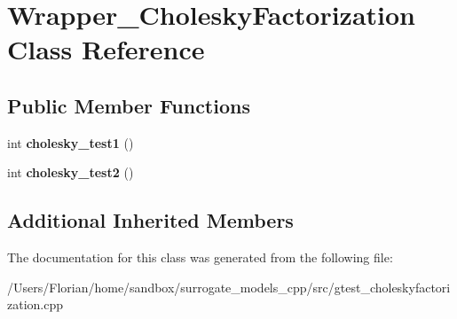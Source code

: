 \hypertarget{class_wrapper___cholesky_factorization}{}\section{Wrapper\+\_\+\+Cholesky\+Factorization Class Reference}
\label{class_wrapper___cholesky_factorization}
\subsection*{Public Member Functions}
\begin{DoxyCompactItemize}
\item 
int {\bfseries cholesky\+\_\+test1} ()\hypertarget{class_wrapper___cholesky_factorization_ae124274117c0d0f5cd5b284eee60980c}{}\label{class_wrapper___cholesky_factorization_ae124274117c0d0f5cd5b284eee60980c}

\item 
int {\bfseries cholesky\+\_\+test2} ()\hypertarget{class_wrapper___cholesky_factorization_a940507de921b2943717f4605fc0ade1c}{}\label{class_wrapper___cholesky_factorization_a940507de921b2943717f4605fc0ade1c}

\end{DoxyCompactItemize}
\subsection*{Additional Inherited Members}


The documentation for this class was generated from the following file\+:\begin{DoxyCompactItemize}
\item 
/\+Users/\+Florian/home/sandbox/surrogate\+\_\+models\+\_\+cpp/src/gtest\+\_\+choleskyfactorization.\+cpp\end{DoxyCompactItemize}
